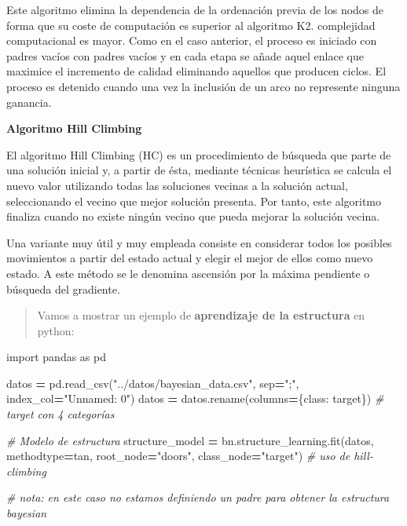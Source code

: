 \documentclass[
  a4paper,
  DIV=11,
  numbers=noendperiod]{scrreprt}
\newenvironment{Shaded}{\begin{snugshade}}{\end{snugshade}}
\newcommand{\CommentTok}[1]{\textcolor[rgb]{0.56,0.35,0.01}{\textit{#1}}}
\newcommand{\ImportTok}[1]{#1}
\newcommand{\NormalTok}[1]{#1}
\newcommand{\OperatorTok}[1]{\textcolor[rgb]{0.81,0.36,0.00}{\textbf{#1}}}
\newcommand{\StringTok}[1]{\textcolor[rgb]{0.31,0.60,0.02}{#1}}
\begin{document}
Este algoritmo elimina la dependencia de la ordenación previa de los
nodos de forma que su coste de computación es superior al algoritmo K2.
complejidad computacional es mayor. Como en el caso anterior, el proceso
es iniciado con padres vacíos con padres vacíos y en cada etapa se añade
aquel enlace que maximice el incremento de calidad eliminando aquellos
que producen ciclos. El proceso es detenido cuando una vez la inclusión
de un arco no represente ninguna ganancia.

\textbf{Algoritmo Hill Climbing}

El algoritmo Hill Climbing (HC) es un procedimiento de búsqueda que
parte de una solución inicial y, a partir de ésta, mediante técnicas
heurística se calcula el nuevo valor utilizando todas las soluciones
vecinas a la solución actual, seleccionando el vecino que mejor solución
presenta. Por tanto, este algoritmo finaliza cuando no existe ningún
vecino que pueda mejorar la solución vecina.

Una variante muy útil y muy empleada consiste en considerar todos los
posibles movimientos a partir del estado actual y elegir el mejor de
ellos como nuevo estado. A este método se le denomina ascensión por la
máxima pendiente o búsqueda del gradiente.

\begin{quote}
Vamos a mostrar un ejemplo de \textbf{aprendizaje de la estructura} en
python:
\end{quote}

\begin{Shaded}
\begin{Highlighting}[numbers=left,,]
\ImportTok{import}\NormalTok{ pandas }\ImportTok{as}\NormalTok{ pd}

\NormalTok{datos }\OperatorTok{=}\NormalTok{ pd.read\_csv(}\StringTok{"../datos/bayesian\_data.csv"}\NormalTok{, sep}\OperatorTok{=}\StringTok{";"}\NormalTok{, index\_col}\OperatorTok{=}\StringTok{"Unnamed: 0"}\NormalTok{)}
\NormalTok{datos }\OperatorTok{=}\NormalTok{ datos.rename(columns}\OperatorTok{=}\NormalTok{\{}\StringTok{\textquotesingle{}class\textquotesingle{}}\NormalTok{: }\StringTok{\textquotesingle{}target\textquotesingle{}}\NormalTok{\})  }\CommentTok{\# target con 4 categorías}


\CommentTok{\# Modelo de estructura}
\NormalTok{structure\_model }\OperatorTok{=}\NormalTok{ bn.structure\_learning.fit(datos, methodtype}\OperatorTok{=}\StringTok{\textquotesingle{}tan\textquotesingle{}}\NormalTok{, root\_node}\OperatorTok{=}\StringTok{"doors"}\NormalTok{, class\_node}\OperatorTok{=}\StringTok{"target"}\NormalTok{) }\CommentTok{\# uso de hill{-}climbing}

\CommentTok{\# nota: en este caso no estamos definiendo un padre para obtener la estructura bayesian}
\end{Highlighting}
\end{Shaded}
\end{document}
